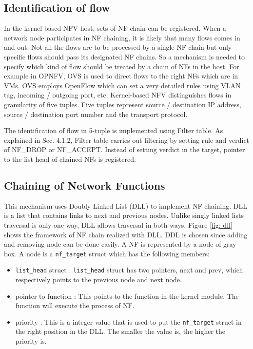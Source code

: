 \subsection{Identification of flow}
In the kernel-based NFV host, sets of NF chain can be registered. When a network node participates in NF chaining, it is likely that many flows comes in and out. Not all the flows are to be processed by a single NF chain but only specific flows should pass its designated NF chains. So a mechanism is needed to specify which kind of flow should be treated by a chain of NFs in the host. For example in OPNFV, OVS is used to direct flows to the right NFs which are in VMs. OVS employs OpenFlow which can set a very detailed rules using VLAN tag, incoming / outgoing port, etc. Kernel-based NFV distinguishes flows in granularity of five tuples. Five tuples represent source / destination IP address, source / destination port number and the transport protocol. 

The identification of flow in 5-tuple is implemented using Filter table. As explained in Sec. 4.1.2, Filter table carries out filtering by setting rule and verdict of NF\_DROP or NF\_ACCEPT. Instead of setting verdict in the target, pointer to the list head of chained NFs is registered. 

\subsection{Chaining of Network Functions}
This mechanism uses Doubly Linked List (DLL) to implement NF chaining. DLL is a list that contains links to next and previous nodes. Unlike singly linked lists traversal is only one way, DLL allows traversal in both ways. 
Figure \ref{fig: dll} shows the framework of NF chain realized with DLL. DDL is chosen since adding and removing node can be done easily. A NF is represented by a node of gray box. A node is a {\tt nf\_target} struct which has the following members: 
\begin{itemize}
	\item {\tt list\_head} struct : {\tt list\_head} struct has two pointers, next and prev, which respectively points to the previous node and next node. 
	\item pointer to function : This points to the function in the kernel module. The function will execute the process of NF.
	\item priority : This is a integer value that is used to put the {\tt nf\_target} struct in the right position in the DLL. The smaller the value is, the higher the priority is.
\end{itemize}

